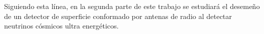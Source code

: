 	Siguiendo esta l\'inea, en la segunda parte de este trabajo se estudiar\'a el deseme\~no de un detector de superficie conformado por antenas de radio al detectar neutrinos c\'osmicos ultra energ\'eticos.
	
	
	

	




	
	
